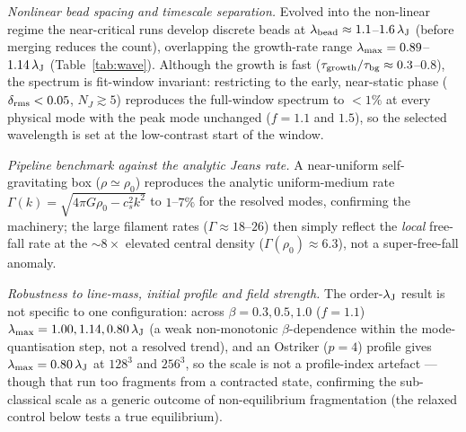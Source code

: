 \documentclass[usenatbib,twoside,twocolumn]{mnras}
\begin{document}
\emph{Nonlinear bead spacing and timescale separation.} Evolved into the non-linear regime the near-critical runs develop discrete beads at $\lambda_{\rm bead}\approx1.1$--$1.6\,\lambda_{\rm J}$ (before merging reduces the count), overlapping the growth-rate range $\lambda_{\rm max}=0.89$--$1.14\,\lambda_{\rm J}$ (Table~\ref{tab:wave}). Although the growth is fast ($\tau_{\rm growth}/\tau_{\rm bg}\approx0.3$--$0.8$), the spectrum is fit-window invariant: restricting to the early, near-static phase ($\delta_{\rm rms}<0.05$, $N_J\gtrsim5$) reproduces the full-window spectrum to $<1\%$ at every physical mode with the peak mode unchanged ($f=1.1$ and $1.5$), so the selected wavelength is set at the low-contrast start of the window.

\emph{Pipeline benchmark against the analytic Jeans rate.} A near-uniform self-gravitating box ($\rho\simeq\rho_0$) reproduces the analytic uniform-medium rate $\Gamma(k)=\sqrt{4\pi G\rho_0-c_s^2k^2}$ to $1$--$7\%$ for the resolved modes, confirming the machinery; the large filament rates ($\Gamma\approx18$--$26$) then simply reflect the \emph{local} free-fall rate at the $\sim8\times$ elevated central density ($\Gamma(\rho_0)\approx6.3$), not a super-free-fall anomaly.

\emph{Robustness to line-mass, initial profile and field strength.} The order-$\lambda_{\rm J}$ result is not specific to one configuration: across $\beta=0.3,0.5,1.0$ ($f=1.1$) $\lambda_{\rm max}=1.00,1.14,0.80\,\lambda_{\rm J}$ (a weak non-monotonic $\beta$-dependence within the mode-quantisation step, not a resolved trend), and an Ostriker ($p=4$) profile gives $\lambda_{\rm max}=0.80\,\lambda_{\rm J}$ at $128^3$ and $256^3$, so the scale is not a profile-index artefact --- though that run too fragments from a contracted state, confirming the sub-classical scale as a generic outcome of non-equilibrium fragmentation (the relaxed control below tests a true equilibrium).
\end{document}
